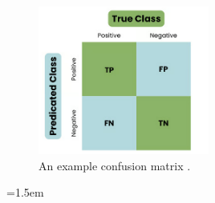 \documentclass[12pt]{report}
\begin{document}
\begin{figure}[H]
    \centering
    \includegraphics[width=0.5\textwidth]{Proposal/ConfusionMatrix.png}
    \caption{An example confusion matrix \autocite{datacampWhatConfusionMatrix}. \label{fig:ConfusionMatrix}}
\end{figure}




\emergencystretch=1.5em
\printbibliography


\end{document}
